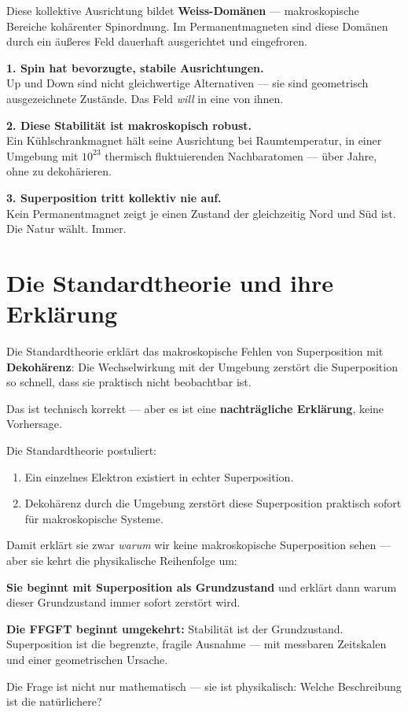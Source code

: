 Diese kollektive Ausrichtung bildet \textbf{Weiss-Domänen} ---
makroskopische Bereiche kohärenter Spinordnung.
Im Permanentmagneten sind diese Domänen durch ein
äußeres Feld dauerhaft ausgerichtet und eingefroren.

\begin{keyresult}
\textbf{1. Spin hat bevorzugte, stabile Ausrichtungen.}\\
Up und Down sind nicht gleichwertige Alternativen ---
sie sind geometrisch ausgezeichnete Zustände.
Das Feld \emph{will} in eine von ihnen.

\textbf{2. Diese Stabilität ist makroskopisch robust.}\\
Ein Kühlschrankmagnet hält seine Ausrichtung
bei Raumtemperatur, in einer Umgebung mit $10^{23}$
thermisch fluktuierenden Nachbaratomen ---
über Jahre, ohne zu dekohärieren.

\textbf{3. Superposition tritt kollektiv nie auf.}\\
Kein Permanentmagnet zeigt je einen Zustand
der gleichzeitig Nord und Süd ist.
Die Natur wählt. Immer.
\end{keyresult}

\section{Die Standardtheorie und ihre Erklärung}
\label{sec:standard}

Die Standardtheorie erklärt das makroskopische Fehlen
von Superposition mit \textbf{Dekohärenz}:
Die Wechselwirkung mit der Umgebung zerstört die Superposition
so schnell, dass sie praktisch nicht beobachtbar ist.

Das ist technisch korrekt --- aber es ist eine
\textbf{nachträgliche Erklärung}, keine Vorhersage.

\begin{important}
Die Standardtheorie postuliert:
\begin{enumerate}
  \item Ein einzelnes Elektron existiert in echter Superposition.
  \item Dekohärenz durch die Umgebung zerstört diese Superposition
    praktisch sofort für makroskopische Systeme.
\end{enumerate}

Damit erklärt sie zwar \emph{warum} wir keine makroskopische
Superposition sehen --- aber sie kehrt die physikalische
Reihenfolge um:

\textbf{Sie beginnt mit Superposition als Grundzustand}
und erklärt dann warum dieser Grundzustand immer sofort
zerstört wird.

\textbf{Die FFGFT beginnt umgekehrt:}
Stabilität ist der Grundzustand.
Superposition ist die begrenzte, fragile Ausnahme ---
mit messbaren Zeitskalen und einer geometrischen Ursache.

Die Frage ist nicht nur mathematisch --- sie ist physikalisch:
Welche Beschreibung ist die natürlichere?
\end{important}

